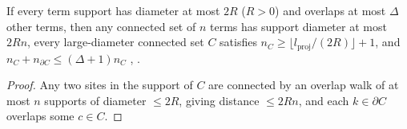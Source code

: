 \begin{lemma}
    \label{thm:hastings_large_diameter_count}
    \leanok
    If every term support has diameter at most $2R$ ($R>0$) and overlaps at most
    $\Delta$ other terms, then any connected set of $n$ terms has support
    diameter at most $2Rn$, every large-diameter connected set $C$ satisfies
    $n_C\ge\lfloor l_{\mathrm{proj}}/(2R)\rfloor+1$, and
    $n_C+n_{\partial C}\le(\Delta+1)n_C$
    \cite[line 1235]{Hastings2006Solving},
    \cite{gap:hastings05_percolation_cluster_size}.
\end{lemma}
\begin{proof}
    \leanok
    Any two sites in the support of $C$ are connected by an overlap walk of at
    most $n$ supports of diameter $\le2R$, giving distance $\le2Rn$, and each
    $k\in\partial C$ overlaps some $c\in C$.
\end{proof}

